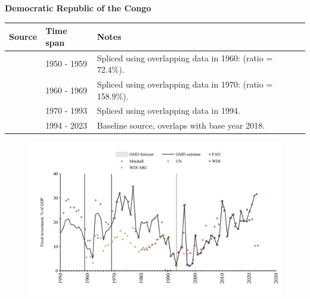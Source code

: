 \documentclass[12pt,a4paper,landscape]{article}
\begin{document}
\begin{adjustbox}{max totalsize={\paperwidth}{\paperheight},center}
\begin{minipage}[t][\textheight][t]{\textwidth}
\vspace*{0.5cm}
{}
\begin{center}
{\Large\bfseries Democratic Republic of the Congo}
\end{center}
\vspace{0.5cm}
\begin{table}[H]
\centering
\small
\begin{tabular}{|l|l|l|}
\hline
\textbf{Source} & \textbf{Time span} & \textbf{Notes} \\
\hline
\rowcolor{white}\cite{Mitchell}& 1950 - 1959 &Spliced using overlapping data in 1960: (ratio = 72.4\%).\\
\rowcolor{lightgray}\cite{WDI_ARC}& 1960 - 1969 &Spliced using overlapping data in 1970: (ratio = 158.9\%).\\
\rowcolor{white}\cite{UN}& 1970 - 1993 &Spliced using overlapping data in 1994.\\
\rowcolor{lightgray}\cite{WDI}& 1994 - 2023 &Baseline source, overlaps with base year 2018.\\
\hline
\end{tabular}
\end{table}
\begin{figure}[H]
\centering
\includegraphics[width=\textwidth,height=0.6\textheight,keepaspectratio]{graphs/COD_finv_GDP.pdf}
\end{figure}
\end{minipage}
\end{adjustbox}
\end{document}
